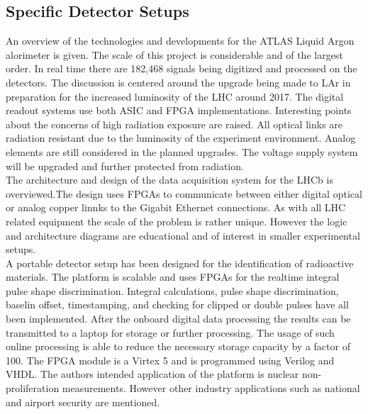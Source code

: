 \documentclass[12pt]{article}
\begin{document}
\subsection{Specific Detector Setups}

{\large\textbf{\cite{Chen2010261}}}
An overview of the technologies and developments for the ATLAS Liquid Argon alorimeter is given. The scale of this project is considerable and of the largest order. In real time there are 182,468 signals being digitized and processed on the detectors. The discussion is centered around the upgrade being made to LAr in preparation for the increased luminosity of the LHC around 2017. The digital readout systems use both ASIC and FPGA implementations.
Interesting points about the concerns of high radiation exposure are raised. All optical links are radiation resistant due to the luminosity of the experiment environment. Analog elements are still considered in the planned upgrades. The voltage supply system will be upgraded and further protected from radiation.
 \\[20pt]


{\large\textbf{\cite{Haefeli2006119}}}
The architecture and design of the data acquisition system for the LHCb is overviewed.The design uses FPGAs to communicate between either digital optical or analog copper linnks to the Gigabit Ethernet connections. As with all LHC related equipment the scale of the problem is rather unique. However the logic and architecture diagrams are educational and of interest in smaller experimental setups.
\\[20pt]


{\large\textbf{\cite{Schiffer2011491}}}
A portable detector setup has been designed for the identification of radioactive materials. The platform is scalable and uses FPGAs for the realtime integral pulse shape discrimination. Integral calculations, pulse shape discrimination, baselin offset, timestamping, and checking for clipped or double pulses have all been implemented. After the onboard digital data processing the results can be transmitted to a laptop for storage or further processing. The usage of such online processing is able to reduce the necessary storage capacity by a factor of 100. The FPGA module is a Virtex 5 and is programmed using Verilog and VHDL. The authors intended application of the platform is nuclear non-proliferation measurements. However other industry applications such as national and airport security are mentioned.
\\[20pt]





\end{document}
